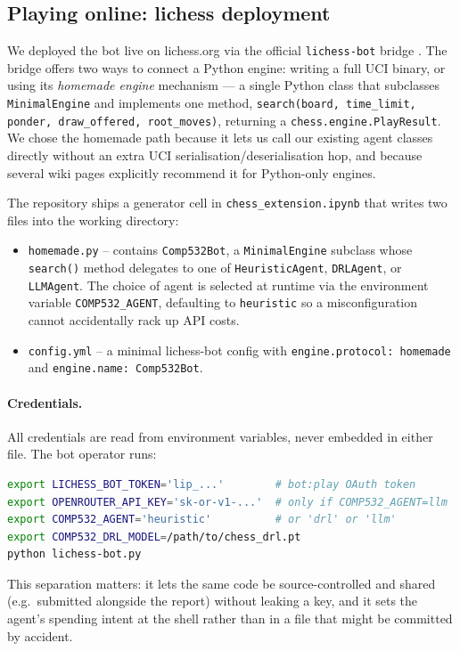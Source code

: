 \documentclass[11pt,a4paper]{article}
\begin{document}
\subsection{Playing online: lichess deployment}
\label{sec:online}

We deployed the bot live on lichess.org via the official
\texttt{lichess-bot} bridge \cite{lichessbot}. The bridge offers two
ways to connect a Python engine: writing a full UCI binary, or using
its \emph{homemade engine} mechanism --- a single Python class that
subclasses \texttt{MinimalEngine} and implements one method,
\texttt{search(board, time\_limit, ponder, draw\_offered, root\_moves)},
returning a \texttt{chess.engine.PlayResult}. We chose the homemade
path because it lets us call our existing agent classes directly
without an extra UCI serialisation/deserialisation hop, and because
several wiki pages \cite{lichessbot-wiki} explicitly recommend it for
Python-only engines.

The repository ships a generator cell in
\texttt{chess\_extension.ipynb} that writes two files into the
working directory:
\begin{itemize}
  \item \texttt{homemade.py} -- contains \texttt{Comp532Bot}, a
    \texttt{MinimalEngine} subclass whose \texttt{search()} method
    delegates to one of \texttt{HeuristicAgent},
    \texttt{DRLAgent}, or \texttt{LLMAgent}. The choice of agent is
    selected at runtime via the environment variable
    \texttt{COMP532\_AGENT}, defaulting to \texttt{heuristic} so a
    misconfiguration cannot accidentally rack up API costs.
  \item \texttt{config.yml} -- a minimal lichess-bot config with
    \texttt{engine.protocol: homemade} and
    \texttt{engine.name: Comp532Bot}.
\end{itemize}

\paragraph{Credentials.} All credentials are read from environment
variables, never embedded in either file. The bot operator runs:
\begin{lstlisting}[language=bash]
export LICHESS_BOT_TOKEN='lip_...'        # bot:play OAuth token
export OPENROUTER_API_KEY='sk-or-v1-...'  # only if COMP532_AGENT=llm
export COMP532_AGENT='heuristic'          # or 'drl' or 'llm'
export COMP532_DRL_MODEL=/path/to/chess_drl.pt
python lichess-bot.py
\end{lstlisting}
This separation matters: it lets the same code be source-controlled
and shared (e.g.\ submitted alongside the report) without leaking a
key, and it sets the agent's spending intent at the shell rather
than in a file that might be committed by accident.
\end{document}
